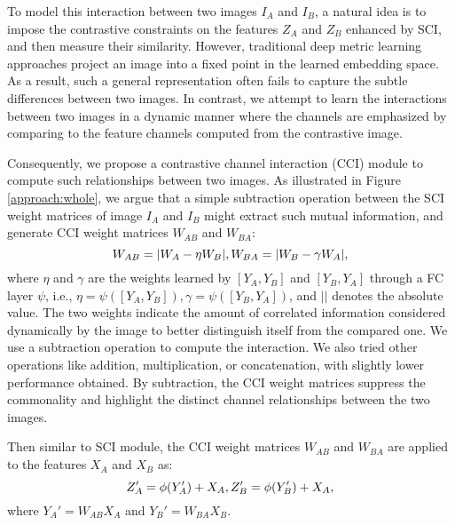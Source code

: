 \documentclass[letterpaper]{article} \usepackage{aaai20}  \usepackage{times}  \usepackage{helvet} \usepackage{courier}  \usepackage[hyphens]{url}  \usepackage{graphicx} \urlstyle{rm} \def\UrlFont{\rm}  \usepackage{graphicx}  \frenchspacing  \setlength{\pdfpagewidth}{8.5in}  \setlength{\pdfpageheight}{11in}  \usepackage{amsmath,amssymb}
\begin{document}
To model this interaction between two images $I_A$ and $I_B$, a natural idea is to impose the contrastive constraints on the features  $Z_A$ and $Z_B$ enhanced by SCI, and then measure their similarity. However, traditional deep metric learning approaches project an image into a fixed point in the learned embedding space. As a result, such a general representation often fails to capture the subtle differences between two images. In contrast, we attempt to learn the interactions between two images in a dynamic manner where the channels are emphasized by comparing to the feature channels computed from the contrastive image.

Consequently, we propose a contrastive channel interaction (CCI) module to compute such relationships between two images. As illustrated in Figure \ref{approach:whole}, we argue that a simple subtraction operation between the SCI weight matrices of image $I_A$ and $I_B$ might extract such mutual information, and generate CCI weight matrices $W_{AB}$ and $W_{BA}$:
\begin{equation}\label{eq:cci-matrix}
W_{AB} = |W_A - \eta W_B|,\\
W_{BA} = |W_B - \gamma W_A| ,
\end{equation}
where $\eta$ and $\gamma$ are the weights learned by $[Y_A,Y_B]$ and $[Y_B,Y_A]$ through a FC layer $\psi$, i.e., $\eta = \psi([Y_A,Y_B]), \gamma = \psi([Y_B,Y_A])$, and $||$ denotes the absolute value.
The two weights indicate the amount of correlated information considered dynamically by the image to better distinguish itself from the compared one.
We use a subtraction operation to compute the interaction. We also tried other operations like addition, multiplication, or concatenation, with slightly lower performance obtained. By subtraction,
the CCI weight matrices suppress the commonality and highlight the distinct channel relationships between the two images.

Then similar to SCI module, the CCI weight matrices $W_{AB}$ and $W_{BA}$ are applied to the features $X_A$ and $X_B$ as:
\begin{equation}\label{eq:atten-input}
Z_{A}' = \phi(Y_{A}')+X_A,  \\
Z_{B}' = \phi(Y_{B}')+X_A,
\end{equation}
where $Y_{A}' = W_{AB}X_A$ and $Y_{B}' = W_{BA}X_B$.
\end{document}
